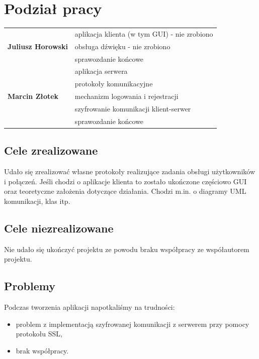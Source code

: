\documentclass[12pt,a4paper]{article}
\begin{document}
	\section{Podział pracy}
	
	\begin{table}[h!]
		\begin{center}
			\label{tab:table1}
			\begin{tabular}{|p{}|p{}|}
				
				\hline
				\multirow{3}{*}{\large\textbf{Juliusz Horowski}} & aplikacja klienta (w tym GUI) - nie zrobiono\\
				\cline{2-2} & obsługa dźwięku - nie zrobiono \\
				\cline{2-2} & sprawozdanie końcowe \\
				\hline
				\multirow{5}{*}{\large\textbf{Marcin Złotek}} & aplikacja serwera \\
				\cline{2-2} & protokoły komunikacyjne \\
				\cline{2-2} & mechanizm logowania i rejestracji \\
				\cline{2-2} & szyfrowanie komunikacji klient-serwer \\
				\cline{2-2} & sprawozdanie końcowe \\
				\hline

			\end{tabular}
		\end{center}
	\end{table}
	
	\subsection{Cele zrealizowane}
	\par Udało się zrealizować własne protokoły realizujące zadania obsługi użytkowników i połączeń. Jeśli chodzi o aplikacje klienta to zostało ukończone częściowo GUI oraz teoretyczne założenia dotyczące działania. Chodzi m.in. o diagramy UML komunikacji, klas itp. 
	
	\subsection{Cele niezrealizowane}
	\par Nie udało się ukończyć projektu ze powodu braku współpracy ze współautorem projektu. 
	
	\subsection{Problemy}
	Podczas tworzenia aplikacji napotkaliśmy na trudności:
	\begin{itemize}
		\item problem z implementacją szyfrowanej komunikacji z serwerem przy pomocy protokołu SSL,
		\item brak współpracy.
	\end{itemize}
	
\end{document}
